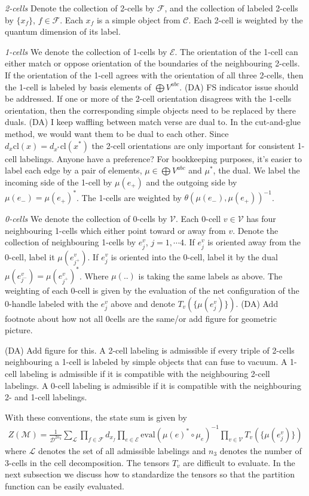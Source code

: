 \documentclass[12pt,a4paper]{article}
\newcommand{\mce}{\mathcal{E}}
\newcommand{\mcd}{\mathcal{D}}
\newcommand{\mcl}{\mathcal{L}}
\newcommand{\mcc}{\mathcal{C}}
\newcommand{\mcm}{\mathcal{M}}
\newcommand{\mcv}{\mathcal{V}}
\newcommand{\mcf}{\mathcal{F}}
\newcommand{\dave}[1]{{\color{ao(english)}\footnotesize{(DA) #1}}}
\begin{document}
{\it 2-cells}
Denote the collection of 2-cells by $\mcf$, 
and the collection of labeled 2-cells by $\{ x_f \}$, $f \in \mcf$.
Each $x_f$ is a simple object from $\mcc$.
Each 2-cell is weighted by the quantum dimension of its label. 

{\it 1-cells}
We denote the collection of 1-cells by $\mce$.
The orientation of the 1-cell can either match or oppose orientation of the boundaries of the neighbouring 2-cells. 
If the orientation of the 1-cell agrees with the orientation of all three 2-cells, 
then the 1-cell is labeled by basis elements of $\bigoplus V^{abc}$.
\dave{FS indicator issue should be addressed. }
If one or more of the 2-cell orientation disagrees with the 1-cells orientation, 
then the corresponding simple objects need to be replaced by there duals.
\dave{I keep waffling between match verse are dual to. 
In the cut-and-glue method, we would want them to be dual to each other.
Since $d_x \text{cl}(x) = d_{x^*} \text{cl}(x^*)$ the 2-cell orientations are only important for consistent 1-cell labelings.
Anyone have a preference?}
For bookkeeping purposes, it's easier to label each edge by a pair of elements, $\mu \in  \bigoplus V^{abc}$ and $\mu^*$, the dual. 
We label the incoming side of the 1-cell by $\mu(e_+)$ and the outgoing side by $\mu(e_-) = \mu(e_+)^*$.
The 1-cells are weighted by $\theta(\mu(e_-),\mu(e_+))^{-1}$.

{\it 0-cells}
We denote the collection of 0-cells by $\mcv$. 
Each 0-cell $v \in \mcv$ has four neighbouring 1-cells which either point toward or away from $v$. 
Denote the collection of neighbouring 1-cells by $e^v_j$, $j =1, \cdots 4$. 
If $e^v_j$ is oriented away from the 0-cell, 
label it $\mu(e^v_{j^+})$.
If $e_j^v$ is oriented into the 0-cell, 
label it by the dual $\mu(e^v_{j^-}) = \mu(e^v_{j^+})^*$.
Where $\mu(..)$ is taking the same labels as above.
The weighting of each 0-cell is given by the evaluation of the net configuration 
of the 0-handle labeled with the $e_j^v$ above and denote $T_v( \{ \mu(e^v_j) \})$.
\dave{Add footnote about how not all 0cells are the same/or add figure for geometric picture.}

\dave{Add figure for this.}
A 2-cell labeling is admissible if every triple of 2-cells neighbouring a 1-cell is labeled by simple objects that can fuse to vacuum. 
A 1-cell labeling is admissible if it is compatible with the neighbouring 2-cell labelings.
A 0-cell labeling is admissible if it is compatible with the neighbouring 2- and 1-cell labelings.

With these conventions, the state sum is given by
\begin{align}
Z(\mcm) = \frac{1}{\mcd^{2n_3}}\sum_{ \mcl } \prod_{f \in \mcf} d_{x_f}  \prod_{e \in \mce} \text{eval}(\mu(e)^*\circ \mu_e)^{-1} \prod_{v \in \mcv} T_v(\{ \mu(e_j^v) \})
\label{state_sum}
\end{align}
where $\mcl$ denotes the set of all admissible labelings and $n_3$ denotes the number of 3-cells in the cell decomposition. 
The tensors $T_v$ are difficult to evaluate. 
In the next subsection we discuss how to standardize the tensors so that the partition function can be easily evaluated. 
\end{document}
